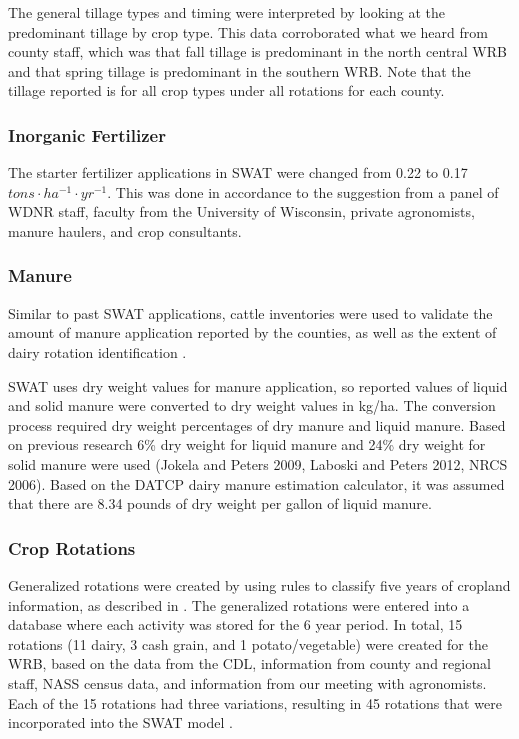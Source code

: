 The general tillage types and timing were interpreted by looking at the predominant tillage by
crop type. This data corroborated what we heard from county staff, which was that
fall tillage is predominant in the north central WRB and that spring tillage is predominant in the
southern WRB. Note that the tillage reported is for all crop types under all rotations for each county.

\subsubsection{Inorganic Fertilizer}

The starter fertilizer applications in SWAT were changed from 0.22 to 0.17 $tons \cdot ha^{-1} \cdot yr^{-1}$. This was done in accordance to the suggestion from a panel of WDNR staff, faculty from the University of Wisconsin, private agronomists, manure haulers, and crop consultants.

\subsubsection{Manure}

Similar to past SWAT applications, cattle inventories were used to validate the amount of manure application reported by the counties, as well as the extent of dairy rotation identification \citep{baumgart_source_2005, freihoefer_mead_2007, timm_swat_2011}.

SWAT uses dry weight values for manure application, so reported values of liquid and solid manure were converted to dry weight values in kg/ha. The conversion process required dry weight percentages of dry manure and liquid manure. Based on previous research 6\% dry weight for liquid manure and 24\% dry weight for solid manure were used (Jokela and Peters 2009, Laboski and Peters 2012, NRCS 2006). Based on the DATCP dairy manure estimation calculator, it was assumed that there are 8.34 pounds of dry weight per gallon of liquid manure.

\subsubsection{Crop Rotations}

Generalized rotations were created by using rules to classify five years of cropland information, as described in .  
The generalized rotations were entered into a database where each activity was stored for the 6 year
period. In total, 15 rotations (11 dairy, 3 cash grain, and 1 potato/vegetable) were created for the WRB,
based on the data from the CDL, information from county and regional staff, NASS census data, and
information from our meeting with agronomists. Each of the 15 rotations had three
variations, resulting in 45 rotations that were incorporated into the SWAT model .

